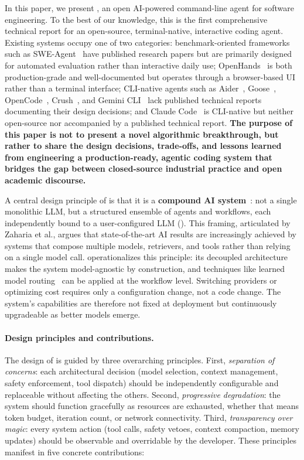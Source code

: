 In this paper, we present \name, an open AI-powered command-line agent for software engineering. To the best of our knowledge, this is the first comprehensive technical report for an open-source, terminal-native, interactive coding agent. Existing systems occupy one of two categories: benchmark-oriented frameworks such as SWE-Agent~\cite{yang2024swe} have published research papers but are primarily designed for automated evaluation rather than interactive daily use; OpenHands~\cite{openhands} is both production-grade and well-documented but operates through a browser-based UI rather than a terminal interface; CLI-native agents such as Aider~\cite{aider2024}, Goose~\cite{block2025goose}, OpenCode~\cite{opencode2025}, Crush~\cite{charmbracelet2025crush}, and Gemini CLI~\cite{google2025geminicli} lack published technical reports documenting their design decisions; and Claude Code~\cite{anthropic2025claudecode} is CLI-native but neither open-source nor accompanied by a published technical report. \textbf{The purpose of this paper is not to present a novel algorithmic breakthrough, but rather to share the design decisions, trade-offs, and lessons learned from engineering a production-ready, agentic coding system that bridges the gap between closed-source industrial practice and open academic discourse.}

A central design principle of \name is that it is a \textbf{compound AI system}~\cite{zaharia2024compound}: not a single monolithic LLM, but a structured ensemble of agents and workflows, each independently bound to a user-configured LLM (). This framing, articulated by Zaharia et al., argues that state-of-the-art AI results are increasingly achieved by systems that compose multiple models, retrievers, and tools rather than relying on a single model call. \name operationalizes this principle: its decoupled architecture makes the system model-agnostic by construction, and techniques like learned model routing~\cite{ong2024routellm} can be applied at the workflow level. Switching providers or optimizing cost requires only a configuration change, not a code change. The system's capabilities are therefore not fixed at deployment but continuously upgradeable as better models emerge.

\paragraph{Design principles and contributions.} The design of \name is guided by three overarching principles. First, \emph{separation of concerns}: each architectural decision (model selection, context management, safety enforcement, tool dispatch) should be independently configurable and replaceable without affecting the others. Second, \emph{progressive degradation}: the system should function gracefully as resources are exhausted, whether that means token budget, iteration count, or network connectivity. Third, \emph{transparency over magic}: every system action (tool calls, safety vetoes, context compaction, memory updates) should be observable and overridable by the developer. These principles manifest in five concrete contributions:

